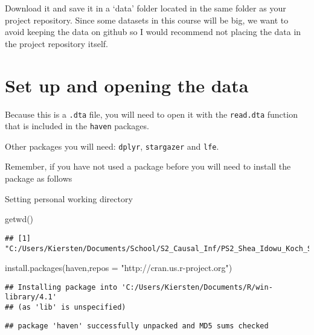 \documentclass[
]{article}
\newenvironment{Shaded}{\begin{snugshade}}{\end{snugshade}}
\newcommand{\AttributeTok}[1]{\textcolor[rgb]{0.77,0.63,0.00}{#1}}
\newcommand{\FunctionTok}[1]{\textcolor[rgb]{0.00,0.00,0.00}{#1}}
\newcommand{\NormalTok}[1]{#1}
\newcommand{\StringTok}[1]{\textcolor[rgb]{0.31,0.60,0.02}{#1}}
\begin{document}
Download it and save it in a `data' folder located in the same folder as
your project repository. Since some datasets in this course will be big,
we want to avoid keeping the data on github so I would recommend not
placing the data in the project repository itself.

\hypertarget{set-up-and-opening-the-data}{%
\section{Set up and opening the
data}\label{set-up-and-opening-the-data}}

Because this is a \texttt{.dta} file, you will need to open it with the
\texttt{read.dta} function that is included in the \texttt{haven}
packages.

Other packages you will need: \texttt{dplyr}, \texttt{stargazer} and
\texttt{lfe}.

Remember, if you have not used a package before you will need to install
the package as follows

Setting personal working directory

\begin{Shaded}
\begin{Highlighting}[]
\FunctionTok{getwd}\NormalTok{()}
\end{Highlighting}
\end{Shaded}

\begin{verbatim}
## [1] "C:/Users/Kiersten/Documents/School/S2_Causal_Inf/PS2_Shea_Idowu_Koch_Stefanelli"
\end{verbatim}

\begin{Shaded}
\begin{Highlighting}[]
\FunctionTok{install.packages}\NormalTok{(}\StringTok{\textquotesingle{}haven\textquotesingle{}}\NormalTok{,}\AttributeTok{repos =} \StringTok{"http://cran.us.r{-}project.org"}\NormalTok{)}
\end{Highlighting}
\end{Shaded}

\begin{verbatim}
## Installing package into 'C:/Users/Kiersten/Documents/R/win-library/4.1'
## (as 'lib' is unspecified)
\end{verbatim}

\begin{verbatim}
## package 'haven' successfully unpacked and MD5 sums checked
\end{verbatim}
\end{document}
